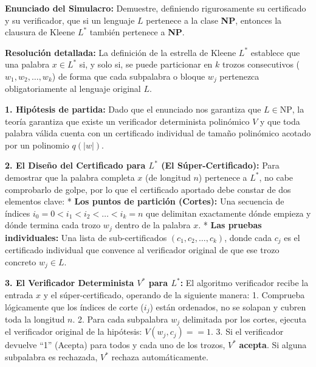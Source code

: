 \documentclass[12pt]{book} %
\begin{document}
\textbf{Enunciado del Simulacro:} Demuestre, definiendo rigurosamente su
certificado y su verificador, que si un lenguaje \(L\) pertenece a la
clase \textbf{NP}, entonces la clausura de Kleene \(L^*\) también
pertenece a \textbf{NP}.

\textbf{Resolución detallada:} La definición de la estrella de Kleene
\(L^*\) establece que una palabra \(x \in L^*\) si, y solo si, se puede
particionar en \(k\) trozos consecutivos (\(w_1, w_2, \dots, w_k\)) de
forma que cada subpalabra o bloque \(w_j\) pertenezca obligatoriamente
al lenguaje original \(L\).

\textbf{1. Hipótesis de partida:} Dado que el enunciado nos garantiza
que \(L \in \text{NP}\), la teoría garantiza que existe un verificador
determinista polinómico \(V\) y que toda palabra válida cuenta con un
certificado individual de tamaño polinómico acotado por un polinomio
\(q(|w|)\).

\textbf{2. El Diseño del Certificado para \(L^*\) (El
Súper-Certificado):} Para demostrar que la palabra completa \(x\) (de
longitud \(n\)) pertenece a \(L^*\), no cabe comprobarlo de golpe, por
lo que el certificado aportado debe constar de dos elementos clave: *
\textbf{Los puntos de partición (Cortes):} Una secuencia de índices
\(i_0 = 0 < i_1 < i_2 < \dots < i_k = n\) que delimitan exactamente
dónde empieza y dónde termina cada trozo \(w_j\) dentro de la palabra
\(x\). * \textbf{Las pruebas individuales:} Una lista de
sub-certificados \((c_1, c_2, \dots, c_k)\), donde cada \(c_j\) es el
certificado individual que convence al verificador original de que ese
trozo concreto \(w_j \in L\).

\textbf{3. El Verificador Determinista \(V^*\) para \(L^*\):} El
algoritmo verificador recibe la entrada \(x\) y el súper-certificado,
operando de la siguiente manera: 1. Comprueba lógicamente que los
índices de corte (\(i_j\)) están ordenados, no se solapan y cubren toda
la longitud \(n\). 2. Para cada subpalabra \(w_j\) delimitada por los
cortes, ejecuta el verificador original de la hipótesis:
\(V(w_j, c_j) == 1\). 3. Si el verificador devuelve ``1'' (Acepta) para
todos y cada uno de los trozos, \(V^*\) \textbf{acepta}. Si alguna
subpalabra es rechazada, \(V^*\) rechaza automáticamente.
\end{document}
